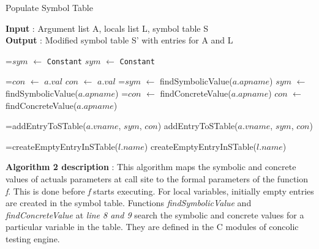 \documentclass[12pt,oneside]{book}
\newcommand*{\thealgruleheight}{.75\baselineskip}
\newcommand*{\thealgruledepth}{.25\baselineskip}
\newcommand{\myState}[1]{%
    \setbox\statebox=\vbox{#1}%
    \edef\thealgruleheight{\dimexpr \the\ht\statebox+1pt\relax}%
    \edef\thealgruledepth{\dimexpr \the\dp\statebox+1pt\relax}%
    \ifdim\thealgruleheight<.75\baselineskip
        \def\thealgruleheight{\dimexpr .75\baselineskip+1pt\relax}%
    \fi
    \ifdim\thealgruledepth<.25\baselineskip
        \def\thealgruledepth{\dimexpr .25\baselineskip+1pt\relax}%
    \fi
    \State #1%
    \def\thealgruleheight{\dimexpr .75\baselineskip+1pt\relax}%
    \def\thealgruledepth{\dimexpr .25\baselineskip+1pt\relax}%
}
\begin{document}
\begin{algorithm}[H]
  \caption{Populate Symbol Table}\label{transform call site}
  \small
  \vspace{4mm}
  {\textbf{Input} : Argument list A, locals list L, symbol table S}\\
  {\textbf{Output} : Modified symbol table S' with entries for A and L}
  \begin{algorithmic}[1]
      \vspace{0.8mm}
        \vspace{0.8mm}
            \myState {$sym$ $\gets$ {\texttt{Constant}}}
            \myState {$con$ $\gets$ $a.val$}             			 
          \Else
            \myState {$sym$ $\gets$ findSymbolicValue($a$.$apname$)} 
			\myState {$con$ $\gets$ findConcreteValue($a$.$apname$)} 
          \EndIf
			\myState {addEntryToSTable($a$.$vname$, $sym$, $con$)}
          \vspace{0.8mm}
      \EndFor
        \vspace{0.8mm}
	    \myState {createEmptyEntryInSTable($l$.$name$)}
      \vspace{0.8mm}
      \EndFor
    \EndProcedure
  \end{algorithmic}
\end{algorithm}



\vspace{6mm}
\noindent
\textbf{Algorithm 2 description} : This algorithm maps the symbolic and concrete values of actuals parameters at call site to the formal parameters of the function \textit{f}. This is done before \textit{f} starts executing. For local variables, initially empty entries are created in the symbol table. Functions \textit{findSymbolicValue} and \textit{findConcreteValue} at \textit{line 8 and 9} search the symbolic and concrete values for a particular variable in the table. They are defined in the C modules of concolic testing engine.
\end{document}
